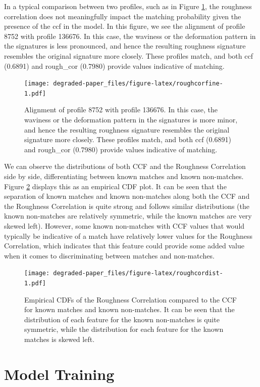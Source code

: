 \documentclass[12pt,]{article}
\theoremstyle{definition}
\theoremstyle{definition}
\theoremstyle{definition}
\theoremstyle{remark}
\begin{document}
In a typical comparison between two profiles, such as in Figure
\ref{fig:roughcorfine}, the roughness correlation does not meaningfully
impact the matching probability given the presence of the ccf in the
model. In this figure, we see the alignment of profile 8752 with profile
136676. In this case, the waviness or the deformation pattern in the
signatures is less pronounced, and hence the resulting roughness
signature resembles the original signature more closely. These profiles
match, and both ccf (0.6891) and rough\_cor (0.7980) provide values
indicative of matching.

\begin{figure}[htbp]
\centering
\texttt{[image: degraded-paper\_files/figure-latex/roughcorfine-1.pdf]}
\caption{\label{fig:roughcorfine}Alignment of profile 8752 with profile
136676. In this case, the waviness or the deformation pattern in the
signatures is more minor, and hence the resulting roughness signature
resembles the original signature more closely. These profiles match, and
both ccf (0.6891) and rough\_cor (0.7980) provide values indicative of
matching.}
\end{figure}

We can observe the distributions of both CCF and the Roughness
Correlation side by side, differentiating between known matches and
known non-matches. Figure \ref{fig:roughcordist} displays this as an
empirical CDF plot. It can be seen that the separation of known matches
and known non-matches along both the CCF and the Roughness Correlation
is quite strong and follows similar distributions (the known non-matches
are relatively symmetric, while the known matches are very skewed left).
However, some known non-matches with CCF values that would typically be
indicative of a match have relatively lower values for the Roughness
Correlation, which indicates that this feature could provide some added
value when it comes to discriminating between matches and non-matches.

\begin{figure}[htbp]
\centering
\texttt{[image: degraded-paper\_files/figure-latex/roughcordist-1.pdf]}
\caption{\label{fig:roughcordist}Empirical CDFs of the Roughness Correlation
compared to the CCF for known matches and known non-matches. It can be
seen that the distribution of each feature for the known non-matches is
quite symmetric, while the distribution for each feature for the known
matches is skewed left.}
\end{figure}

\section{Model Training}\label{model-training}
\end{document}
